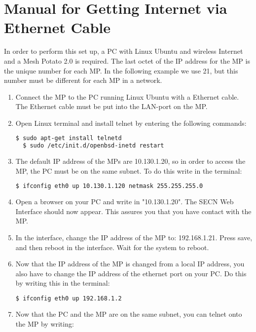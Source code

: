 \section{Manual for Getting Internet via Ethernet Cable}
\label{chp:manualInternetEthernet}

In order to perform this set up, a PC with Linux Ubuntu and wireless Internet and a Mesh Potato 2.0 is required. The last octet of the IP address for the MP is the unique number for each MP. In the following example we use 21, but this number must be different for each MP in a network. 

\begin{enumerate}
\item Connect the MP to the PC running Linux Ubuntu with a Ethernet cable. The Ethernet cable must be put into the LAN-port on the MP. 
\item Open Linux terminal and install telnet by entering the following commands: 
\noindent
\begin{lstlisting}[language=bash]
  $ sudo apt-get install telnetd
  $ sudo /etc/init.d/openbsd-inetd restart 
\end{lstlisting}
\item The default IP address of the MPs are 10.130.1.20, so in order to access the MP, the PC must be on the same subnet. To do this write in the terminal: 
\noindent
\begin{lstlisting}[language=bash]
  $ ifconfig eth0 up 10.130.1.120 netmask 255.255.255.0
\end{lstlisting}
\item Open a browser on your PC and write in "10.130.1.20". The SECN Web Interface should now appear. This assures you that you have contact with the MP.
\item In the interface, change the IP address of the MP to: 192.168.1.21. Press save, and then reboot in the interface. Wait for the system to reboot. 
\item Now that the IP address of the MP is changed from a local IP address, you also have to change the IP address of the ethernet port on your PC. Do this by writing this in the terminal:
\noindent
\begin{lstlisting}[language=bash]
  $ ifconfig eth0 up 192.168.1.2
\end{lstlisting}
\item Now that the PC and the MP are on the same subnet, you can telnet onto the MP by writing: 
\noindent
\begin{lstlisting}[language=bash]

\end{lstlisting}
\end{enumerate}
